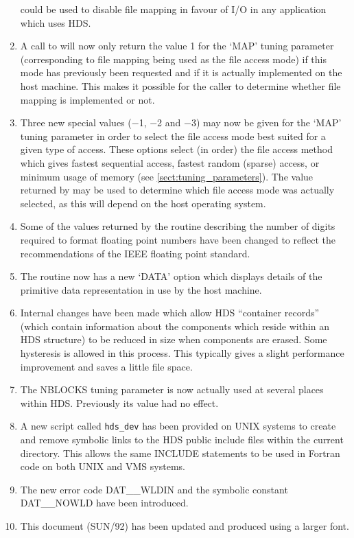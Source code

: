 \documentclass[twoside,11pt]{starlink}
\providecommand{\hi}[1]{{\texttt{#1}}}
\providecommand{\qt}[1]{``#1''}
\begin{document}
\begin{enumerate}
could be used to disable file mapping in favour of I/O in any
application which uses HDS.

\item
A call to  will now only return the
value 1 for the `MAP' tuning parameter (corresponding to file mapping
being used as the file access mode) if this mode has previously been
requested and if it is actually implemented on the host machine. This
makes it possible for the caller to determine whether file mapping is
implemented or not.

\item
Three new special values ($-$1, $-$2 and $-$3) may now be given for
the `MAP' tuning parameter in order to select the file access mode
best suited for a given type of access. These options select (in
order) the file access method which gives fastest sequential access,
fastest random (sparse) access, or minimum usage of memory (see
\ref{sect:tuning_parameters}). The value returned by
 may be used to determine which file
access mode was actually selected, as this will depend on the host
operating system.

\item
Some of the values returned by the routine
 describing the number of digits required
to format floating point numbers have been changed to reflect the
recommendations of the IEEE floating point standard.

\item
The  routine now has a new `DATA' option
which displays details of the primitive data representation in use by
the host machine.

\item
Internal changes have been made which allow HDS \qt{container records}
(which contain information about the components which reside within an
HDS structure) to be reduced in size when components are erased. Some
hysteresis is allowed in this process. This typically gives a slight
performance improvement and saves a little file space.

\item
The NBLOCKS tuning parameter is now actually used at several places
within HDS.  Previously its value had no effect.

\item
A new script called \hi{hds\_dev} has been provided on UNIX systems
to create and remove symbolic links to the HDS public include files
within the current directory. This allows the same INCLUDE statements
to be used in Fortran code on both UNIX and VMS systems.

\item
The new error code DAT\_\_WLDIN and the symbolic constant DAT\_\_NOWLD
have been introduced.

\item
This document (SUN/92) has been updated and produced using a larger
font.

\end{enumerate}
\end{document}
